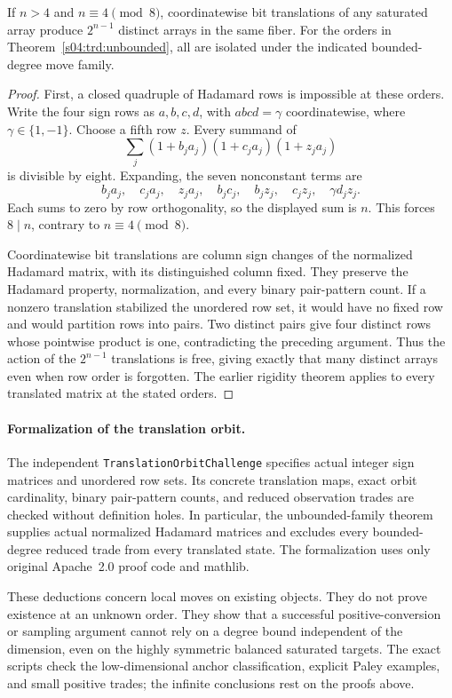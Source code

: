 \begin{proposition}
If $n>4$ and $n\equiv4\pmod8$, coordinatewise bit translations of
any saturated array produce $2^{n-1}$ distinct arrays in the same fiber.
For the orders in Theorem~\ref{s04:trd:unbounded}, all are isolated under
the indicated bounded-degree move family.
\end{proposition}
\begin{proof}
First, a closed quadruple of Hadamard rows is impossible at these
orders. Write the four sign rows as $a,b,c,d$, with $abcd=\gamma$
coordinatewise, where $\gamma\in\{1,-1\}$. Choose a fifth row $z$.
Every summand of
\[
 \sum_j(1+b_ja_j)(1+c_ja_j)(1+z_ja_j)
\]
is divisible by eight. Expanding, the seven nonconstant terms are
\[
 b_ja_j,\quad c_ja_j,\quad z_ja_j,\quad b_jc_j,\quad
 b_jz_j,\quad c_jz_j,\quad\gamma d_jz_j.
\]
Each sums to zero by row orthogonality, so the displayed sum is $n$.
This forces $8\mid n$, contrary to $n\equiv4\pmod8$.

Coordinatewise bit translations are column sign changes of the
normalized Hadamard matrix, with its distinguished column fixed.
They preserve the Hadamard property, normalization, and every binary
pair-pattern count. If a nonzero translation stabilized the unordered
row set, it would have no fixed row and would partition rows into
pairs. Two distinct pairs give four distinct rows whose pointwise
product is one, contradicting the preceding argument. Thus the action
of the $2^{n-1}$ translations is free, giving exactly that many distinct
arrays even when row order is forgotten. The earlier rigidity theorem
applies to every translated matrix at the stated orders.
\end{proof}

\paragraph{Formalization of the translation orbit.}
The independent \texttt{TranslationOrbitChallenge} specifies actual
integer sign matrices and unordered row sets. Its concrete translation
maps, exact orbit cardinality, binary pair-pattern counts, and reduced
observation trades are checked without definition holes. In particular,
the unbounded-family theorem supplies actual normalized Hadamard
matrices and excludes every bounded-degree reduced trade from every
translated state. The formalization uses only original Apache~2.0
proof code and mathlib.


These deductions concern local moves on existing objects. They do not
prove existence at an unknown order. They show that a successful
positive-conversion or sampling argument cannot rely on a degree bound
independent of the dimension, even on the highly symmetric balanced
saturated targets. The exact scripts check the low-dimensional anchor
classification, explicit Paley examples, and small positive trades; the
infinite conclusions rest on the proofs above.

